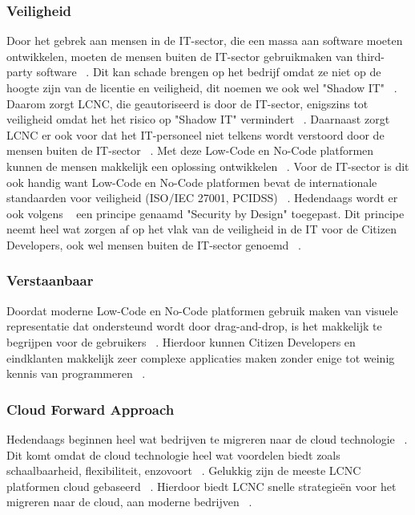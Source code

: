 \subsubsection*{Veiligheid}
\label{sub:veiligheid}
Door het gebrek aan mensen in de IT-sector, die een massa aan software moeten ontwikkelen, moeten de mensen buiten 
de IT-sector gebruikmaken van third-party software ~\autocite{Yan2021}. Dit kan schade brengen op het bedrijf omdat ze niet op de hoogte zijn 
van de licentie en veiligheid, dit noemen we ook wel "Shadow IT" ~\autocite{Yan2021}. Daarom zorgt LCNC, die geautoriseerd is door de IT-sector, enigszins tot veiligheid omdat het
het risico op "Shadow IT" vermindert ~\autocite{Yan2021}. Daarnaast zorgt LCNC er ook voor dat het IT-personeel niet telkens wordt verstoord door de mensen buiten de IT-sector ~\autocite{Yan2021}.
Met deze Low-Code en No-Code platformen kunnen de mensen makkelijk een oplossing ontwikkelen ~\autocite{Yan2021}. Voor de IT-sector is dit ook handig want Low-Code en No-Code platformen bevat 
de internationale standaarden voor veiligheid (ISO/IEC 27001, PCIDSS) ~\autocite{Sufi_2023}. Hedendaags wordt er ook volgens ~\textcite{Sufi_2023} een principe genaamd "Security by Design" toegepast.
Dit principe neemt heel wat zorgen af op het vlak van de veiligheid in de IT voor de Citizen Developers,  ook wel mensen buiten de IT-sector genoemd ~\autocite{Sufi_2023}.

\subsubsection*{Verstaanbaar}
\label{sub:Verstaanbaar}
Doordat moderne Low-Code en No-Code platformen gebruik maken van visuele representatie dat ondersteund wordt door drag-and-drop, is het makkelijk te begrijpen voor de gebruikers ~\autocite{Sufi_2023}.
Hierdoor kunnen Citizen Developers en eindklanten makkelijk zeer complexe applicaties maken zonder enige tot weinig kennis van programmeren ~\autocite{Sufi_2023}.

\subsubsection*{Cloud Forward Approach}
\label{sub:cloud-forward-approach}
Hedendaags beginnen heel wat bedrijven te migreren naar de cloud technologie ~\autocite{Sufi_2023}.
Dit komt omdat de cloud technologie heel wat voordelen biedt zoals schaalbaarheid, flexibiliteit, enzovoort ~\autocite{Sufi_2023}.
Gelukkig zijn de meeste LCNC platformen cloud gebaseerd ~\autocite{Sufi_2023}. 
Hierdoor biedt LCNC snelle strategieën voor het migreren naar de cloud, aan moderne bedrijven ~\autocite{Sufi_2023}.




